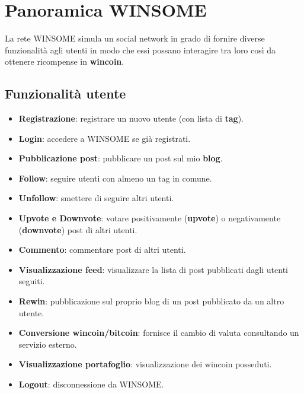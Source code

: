 \section{Panoramica WINSOME}
La rete WINSOME simula un social network in grado di fornire diverse funzionalit\`a agli utenti in modo che essi possano
interagire tra loro cos\`i da ottenere ricompense in \textbf{wincoin}.

\subsection{Funzionalit\`a utente}
\begin{itemize}
	\item \textbf{Registrazione}: registrare un nuovo utente (con lista di \textbf{tag}).
	\item \textbf{Login}: accedere a WINSOME se gi\`a registrati.
	\item \textbf{Pubblicazione post}: pubblicare un post sul mio \textbf{blog}.
	\item \textbf{Follow}: seguire utenti con almeno un tag in comune.
	\item \textbf{Unfollow}: smettere di seguire altri utenti.
	\item \textbf{Upvote e Downvote}: votare positivamente (\textbf{upvote}) o negativamente (\textbf{downvote}) post di
	      altri utenti.
	\item \textbf{Commento}: commentare post di altri utenti.
	\item \textbf{Visualizzazione feed}: visualizzare la lista di post pubblicati dagli utenti seguiti.
	\item \textbf{Rewin}: pubblicazione sul proprio blog di un post pubblicato da un altro utente.
	\item \textbf{Conversione wincoin/bitcoin}: fornisce il cambio di valuta consultando un servizio esterno.
	\item \textbf{Visualizzazione portafoglio}: visualizzazione dei wincoin posseduti.
	\item \textbf{Logout}: disconnessione da WINSOME.
\end{itemize}

